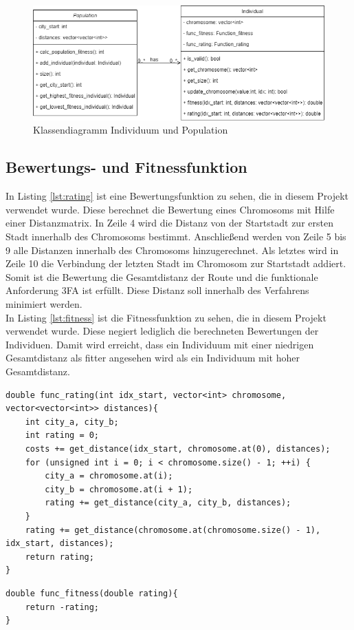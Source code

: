 \begin{figure}[!htb]
\centering
\includegraphics[width=1\textwidth]{img/Vortrag/uml.png}
\caption{Klassendiagramm Individuum und Population}
\label{fig:klassendiagramm}
\end{figure}


\subsection{Bewertungs- und Fitnessfunktion}
In Listing \ref{lst:rating} ist eine Bewertungsfunktion zu sehen, die in diesem Projekt verwendet wurde. Diese berechnet die Bewertung eines Chromosoms mit Hilfe einer Distanzmatrix. In Zeile 4 wird die Distanz von der Startstadt zur ersten Stadt innerhalb des Chromosoms bestimmt. Anschließend werden von Zeile 5 bis 9 alle Distanzen innerhalb des Chromosoms hinzugerechnet. Als letztes wird in Zeile 10 die Verbindung der letzten Stadt im Chromosom zur Startstadt addiert. Somit ist die Bewertung die Gesamtdistanz der Route und die funktionale Anforderung 3FA ist erfüllt. Diese Distanz soll innerhalb des Verfahrens minimiert werden.\\
In Listing \ref{lst:fitness} ist die Fitnessfunktion zu sehen, die in diesem Projekt verwendet wurde. Diese negiert lediglich die berechneten Bewertungen der Individuen. Damit wird erreicht, dass ein Individuum mit einer niedrigen Gesamtdistanz als fitter angesehen wird als ein Individuum mit hoher Gesamtdistanz.

\begin{minipage}[!htb]{\linewidth}
\begin{lstlisting}[caption={Beispiel einer Bewertungsfunktion}, firstnumber=1, captionpos=b, label=lst:rating]
double func_rating(int idx_start, vector<int> chromosome, vector<vector<int>> distances){
	int city_a, city_b;
	int rating = 0;
	costs += get_distance(idx_start, chromosome.at(0), distances);
	for (unsigned int i = 0; i < chromosome.size() - 1; ++i) {
		city_a = chromosome.at(i);
		city_b = chromosome.at(i + 1);
		rating += get_distance(city_a, city_b, distances);
	}
	rating += get_distance(chromosome.at(chromosome.size() - 1), idx_start, distances);
	return rating;
}
\end{lstlisting}
\end{minipage}
\begin{minipage}[!htb]{\linewidth}
\begin{lstlisting}[caption={Beispiel einer Fitnessfunktion}, firstnumber=1, captionpos=b, label=lst:fitness]
double func_fitness(double rating){
	return -rating;
}
\end{lstlisting}
\end{minipage}
